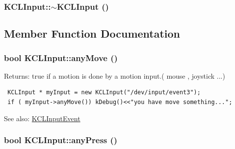 \hypertarget{class_k_c_l_input_aea38929accc31d9f27c08b5d4119fe3}{
\subsubsection[{$\sim$KCLInput}]{\setlength{\rightskip}{0pt plus 5cm}KCLInput::$\sim$KCLInput ()}}
\label{class_k_c_l_input_aea38929accc31d9f27c08b5d4119fe3}




\subsection{Member Function Documentation}
\hypertarget{class_k_c_l_input_28b17185d4d20c96ef67a7bc287f5908}{
\subsubsection[{anyMove}]{\setlength{\rightskip}{0pt plus 5cm}bool KCLInput::anyMove ()}}
\label{class_k_c_l_input_28b17185d4d20c96ef67a7bc287f5908}


\begin{Desc}
\item[Returns:]true if a motion is done by a motion input.( mouse , joystick ...) 

\begin{Code}\begin{verbatim} KCLInput * myInput = new KCLInput("/dev/input/event3");
 if ( myInput->anyMove()) kDebug()<<"you have move something...";
\end{verbatim}
\end{Code}

 \end{Desc}
\begin{Desc}
\item[See also:]\hyperlink{class_k_c_l_input_event}{KCLInputEvent} \end{Desc}
\hypertarget{class_k_c_l_input_c3740f546a1992b7855549405c81dc7b}{
\subsubsection[{anyPress}]{\setlength{\rightskip}{0pt plus 5cm}bool KCLInput::anyPress ()}}
\label{class_k_c_l_input_c3740f546a1992b7855549405c81dc7b}


